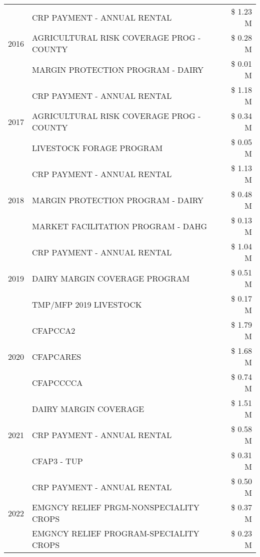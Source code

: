 \begin{tabular}{llr}
\cline{1-3}
\multirow[t]{3}{*}{2016} & CRP PAYMENT - ANNUAL RENTAL & \$ 1.23 M \\
 & AGRICULTURAL RISK COVERAGE PROG - COUNTY & \$ 0.28 M \\
 & MARGIN PROTECTION PROGRAM - DAIRY & \$ 0.01 M \\
\cline{1-3}
\multirow[t]{3}{*}{2017} & CRP PAYMENT - ANNUAL RENTAL & \$ 1.18 M \\
 & AGRICULTURAL RISK COVERAGE PROG - COUNTY & \$ 0.34 M \\
 & LIVESTOCK FORAGE PROGRAM & \$ 0.05 M \\
\cline{1-3}
\multirow[t]{3}{*}{2018} & CRP PAYMENT - ANNUAL RENTAL & \$ 1.13 M \\
 & MARGIN PROTECTION PROGRAM - DAIRY & \$ 0.48 M \\
 & MARKET FACILITATION PROGRAM - DAHG & \$ 0.13 M \\
\cline{1-3}
\multirow[t]{3}{*}{2019} & CRP PAYMENT - ANNUAL RENTAL & \$ 1.04 M \\
 & DAIRY MARGIN COVERAGE PROGRAM & \$ 0.51 M \\
 & TMP/MFP 2019 LIVESTOCK & \$ 0.17 M \\
\cline{1-3}
\multirow[t]{3}{*}{2020} & CFAPCCA2 & \$ 1.79 M \\
 & CFAPCARES & \$ 1.68 M \\
 & CFAPCCCCA & \$ 0.74 M \\
\cline{1-3}
\multirow[t]{3}{*}{2021} & DAIRY MARGIN COVERAGE & \$ 1.51 M \\
 & CRP PAYMENT - ANNUAL RENTAL & \$ 0.58 M \\
 & CFAP3 - TUP & \$ 0.31 M \\
\cline{1-3}
\multirow[t]{3}{*}{2022} & CRP PAYMENT - ANNUAL RENTAL & \$ 0.50 M \\
 & EMGNCY RELIEF PRGM-NONSPECIALITY CROPS & \$ 0.37 M \\
 & EMGNCY RELIEF PROGRAM-SPECIALITY CROPS & \$ 0.23 M \\
\cline{1-3}
\bottomrule
\end{tabular}
